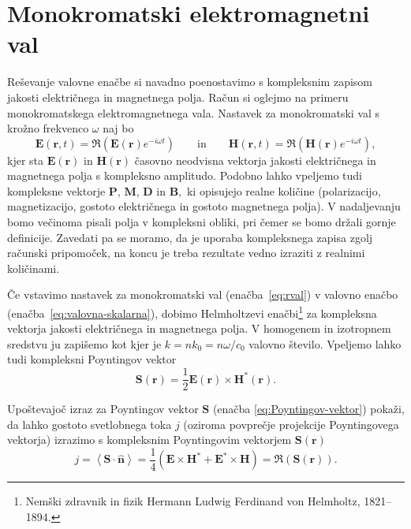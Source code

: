 \section{Monokromatski elektromagnetni val}
Reševanje valovne enačbe si navadno poenostavimo s kompleksnim
zapisom jakosti električnega in magnetnega polja. Račun si
oglejmo na primeru monokromatskega elektromagnetnega vala. Nastavek
za monokromatski val s krožno frekvenco $\omega$ naj bo
\begin{equation}
\mathbf{E}(\mathbf{r},t)  =\mathfrak{\Re}(\mathbf{E}(\mathbf{r})e^{-i\omega t})\qquad \textrm{in} \qquad
\mathbf{H}(\mathbf{r},t)  =\mathfrak{\Re}(\mathbf{H}(\mathbf{r})e^{-i\omega t}),
\label{eq:rval}
\end{equation}
kjer sta $\mathbf E(\mathbf{r})$ in $\mathbf H(\mathbf{r})$ časovno
neodvisna vektorja jakosti električnega in 
magnetnega polja s kompleksno
amplitudo. Podobno lahko vpeljemo tudi kompleksne vektorje $\mathbf{P}$,
$\mathbf{M}$, $\mathbf{D}$ in $\mathbf{B},$ ki opisujejo realne količine (polarizacijo,
magnetizacijo, gostoto električnega in gostoto magnetnega polja).
V nadaljevanju bomo večinoma pisali polja v kompleksni obliki, pri
čemer se bomo držali gornje definicije. Zavedati pa se moramo, da
je uporaba kompleksnega zapisa zgolj računski pripomoček, na koncu
je treba rezultate vedno izraziti z realnimi količinami. 

Če vstavimo nastavek za monokromatski val (enačba~\ref{eq:rval}) v valovno enačbo
(enačba~\ref{eq:valovna-skalarna}), dobimo Helmholtzevi
enačbi\footnote{Nemški zdravnik in fizik Hermann Ludwig Ferdinand von Helmholtz, 1821--1894.} 
za kompleksna vektorja jakosti električnega in magnetnega polja.
V homogenem in izotropnem sredstvu ju zapišemo kot
kjer je $k=nk_{0}=n\omega/c_{0}$ valovno število. Vpeljemo lahko
tudi kompleksni Poyntingov vektor
\begin{equation}
\mathbf{S}(\mathbf{r})=\frac{1}{2}\mathbf{E}(\mathbf{r})\times\mathbf{H}^{*}(\mathbf{r}).
\label{eq:Poyntingov-vektor-c}
\end{equation}
\begin{definition}
Upoštevajoč izraz za Poyntingov vektor $\mathbf{S}$
(enačba \ref{eq:Poyntingov-vektor}) pokaži, da lahko gostoto svetlobnega toka $j$
(oziroma povprečje projekcije Poyntingovega vektorja)
 izrazimo
s kompleksnim Poyntingovim vektorjem $\mathbf{S}(\mathbf{r})$
\begin{equation}
\label{eq:jReS}
j=\left\langle \mathbf{\mathbf{S}}\cdot\mathbf{\hat{n}}\right\rangle =
\frac{1}{4}\left(\mathbf{E}\times\mathbf{H}^{*}+\mathbf{E}^{*}\times\mathbf{H}\right)=\Re(\mathbf{S}
(\mathbf{r})).
\end{equation}
\end{definition}

